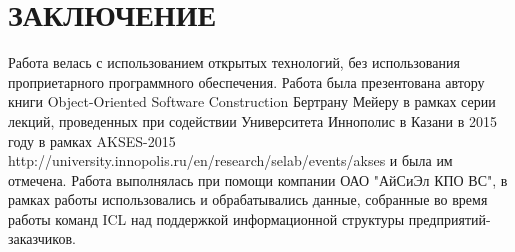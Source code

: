\chapter*{ЗАКЛЮЧЕНИЕ}						%




Работа велась с использованием открытых технологий, без использования проприетарного программного обеспечения. Работа была презентована автору книги Object-Oriented Software Construction \cite{Meyer} Бертрану Мейеру в рамках серии лекций, проведенных при содействии Университета Иннополис в Казани в 2015 году в рамках AKSES-2015 http://university.innopolis.ru/en/research/selab/events/akses и была им отмечена.  
Работа выполнялась при помощи компании ОАО "АйСиЭл КПО ВС", в рамках работы использовались и обрабатывались данные, собранные во время работы команд ICL над поддержкой информационной структуры предприятий-заказчиков.